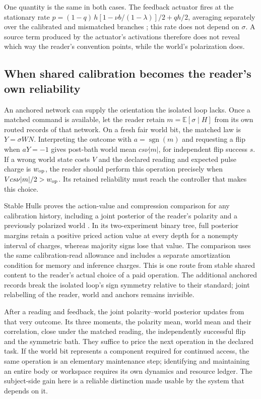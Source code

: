\documentclass[11pt,a4paper]{article}
\newcommand{\E}{\mathbb E}
\newcommand{\sgn}{\operatorname{sgn}}
\begin{document}
One quantity is the same in both cases. The feedback actuator fires at the stationary rate $p=(1-q)\,h[1-\nu b/(1-\lambda)]/2+q h/2$, averaging separately over the calibrated and mismatched branches \cite{ImprintChain}; this rate does not depend on $\sigma$. A source term produced by the actuator's activations therefore does not reveal which way the reader's convention points, while the world's polarization does.

\subsection{When shared calibration becomes the reader's own reliability}

An anchored network can supply the orientation the isolated loop lacks. Once a matched command is available, let the reader retain $m=\E[\sigma\mid H]$ from its own routed records of that network. On a fresh fair world bit, the matched law is $Y=\sigma WN$. Interpreting the outcome with $a=\sgn(m)$ and requesting a flip when $aY=-1$ gives post-bath world mean $cs\nu|m|$, for independent flip success $s$. If a wrong world state costs $V$ and the declared reading and expected pulse charge is $w_{\rm op}$, the reader should perform this operation precisely when $Vcs\nu|m|/2>w_{\rm op}$. Its retained reliability must reach the controller that makes this choice.

Stable Hulls proves the action-value and compression comparison for any calibration history, including a joint posterior of the reader's polarity and a previously polarized world \cite{StableHulls}. In its two-experiment binary tree, full posterior margins retain a positive priced action value at every depth for a nonempty interval of charges, whereas majority signs lose that value. The comparison uses the same calibration-read allowance and includes a separate amortization condition for memory and inference charges. This is one route from stable shared content to the reader's actual choice of a paid operation. The additional anchored records break the isolated loop's sign symmetry relative to their standard; joint relabelling of the reader, world and anchors remains invisible.

After a reading and feedback, the joint polarity--world posterior updates from that very outcome. Its three moments, the polarity mean, world mean and their correlation, close under the matched reading, the independently successful flip and the symmetric bath. They suffice to price the next operation in the declared task. If the world bit represents a component required for continued access, the same operation is an elementary maintenance step; identifying and maintaining an entire body or workspace requires its own dynamics and resource ledger. The subject-side gain here is a reliable distinction made usable by the system that depends on it.
\end{document}
